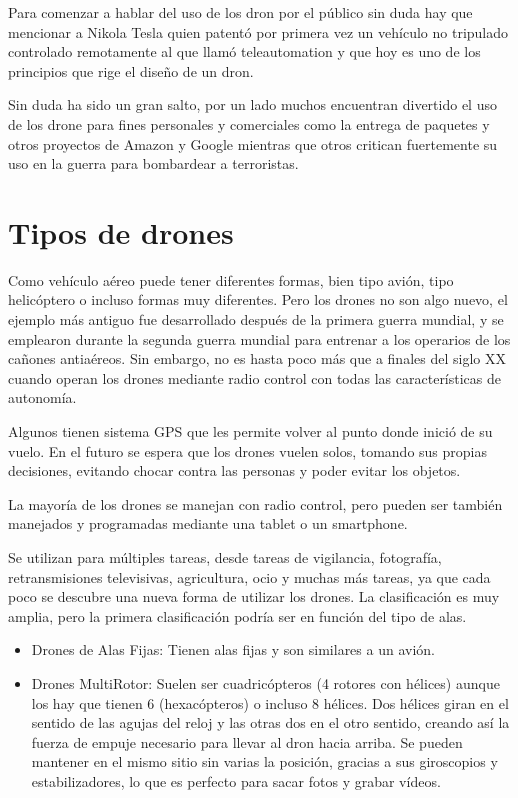 Para comenzar a hablar del uso de los dron por el público sin duda hay que mencionar a Nikola Tesla quien patentó por primera vez un vehículo no tripulado controlado remotamente al que llamó teleautomation y que hoy es uno de los principios que rige el diseño de un dron.    

Sin duda ha sido un gran salto, por un lado muchos encuentran divertido el uso de los drone para fines personales y comerciales como la entrega de paquetes y otros proyectos de Amazon y Google mientras que otros critican fuertemente su uso en la guerra para bombardear a terroristas.

\section{Tipos de drones}
\label{sec:tiposdrones}

Como vehículo aéreo puede tener diferentes formas, bien tipo avión, tipo helicóptero o incluso formas muy diferentes. Pero los drones no son algo nuevo, el ejemplo más antiguo fue desarrollado después de la primera guerra mundial, y se emplearon durante la segunda guerra mundial para entrenar a los operarios de los cañones antiaéreos. Sin embargo, no es hasta poco más que a finales del siglo XX cuando operan los drones mediante radio control con todas las características de autonomía.

Algunos tienen sistema GPS que les permite volver al punto donde inició de su vuelo. En el futuro se espera que los drones vuelen solos, tomando sus propias decisiones, evitando chocar contra las personas y poder evitar los objetos.

La mayoría de los drones se manejan con radio control, pero pueden ser también manejados y programadas mediante una tablet o un smartphone.

Se utilizan para múltiples tareas, desde tareas de vigilancia, fotografía, retransmisiones televisivas, agricultura, ocio y muchas más tareas, ya que cada poco se descubre una nueva forma de utilizar los drones.
La clasificación es muy amplia, pero la primera clasificación podría ser en función del tipo de alas.

\begin{itemize}
\item Drones de Alas Fijas: Tienen alas fijas y son similares a un avión.
\item Drones MultiRotor: Suelen ser cuadricópteros (4 rotores con hélices) aunque los hay que tienen 6 (hexacópteros) o incluso 8 hélices. Dos hélices giran en el sentido de las agujas del reloj y las otras dos en el otro sentido, creando así la fuerza de empuje necesario para llevar al dron hacia arriba. Se pueden mantener en el mismo sitio sin varias la posición, gracias a sus giroscopios y estabilizadores, lo que es perfecto para sacar fotos y grabar vídeos.
\end{itemize}

